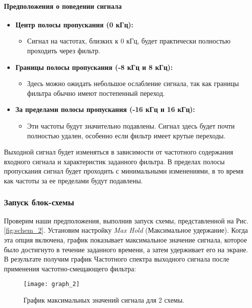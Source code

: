 \documentclass[a4paper,12pt]{extarticle}
\begin{document}
\paragraph{Предположения о поведении сигнала}
\begin{itemize}

    \item \textbf{Центр полосы пропускания (0 кГц):}
    \begin{itemize}
        \item Сигнал на частотах, близких к 0 кГц, будет практически полностью проходить через фильтр.
    \end{itemize}

    \item \textbf{Границы полосы пропускания (-8 кГц и 8 кГц):}
    \begin{itemize}
        \item Здесь можно ожидать небольшое ослабление сигнала, так как границы фильтра обычно имеют постепенный переход.
    \end{itemize}

    \item \textbf{За пределами полосы пропускания (-16 кГц и 16 кГц):}
    \begin{itemize}
        \item Эти частоты будут значительно подавлены. Сигнал здесь будет почти полностью удален, особенно если фильтр имеет крутые переходы.
    \end{itemize}

\end{itemize}

Выходной сигнал будет изменяться в зависимости от частотного содержания входного сигнала и 
характеристик заданного фильтра. В пределах полосы пропускания сигнал будет проходить с 
минимальными изменениями, в то время как частоты за ее пределами будут подавлены.

\subsubsection{Запуск блок-схемы}
\hspace{1.15cm}Проверим наши предположения, выполнив запуск схемы, представленной на Рис. 
\ref{fig:schem_2}. Установим настройку \textit{Max Hold} (Максимальное удержание). 
Когда эта опция включена, график показывает максимальное значение сигнала, которое было 
достигнуто в течение заданного времени, а затем удерживает его на экране. В результате получим 
график Частотного спектра выходного сигнала после применения частотно-смещающего фильтра:\\
\begin{figure}[H]
    \centering
    \texttt{[image: graph\_2]}
    \caption{График максимальных значений сигнала для 2 схемы.} %
    \label{fig:graph_2} %
\end{figure}
\end{document}
